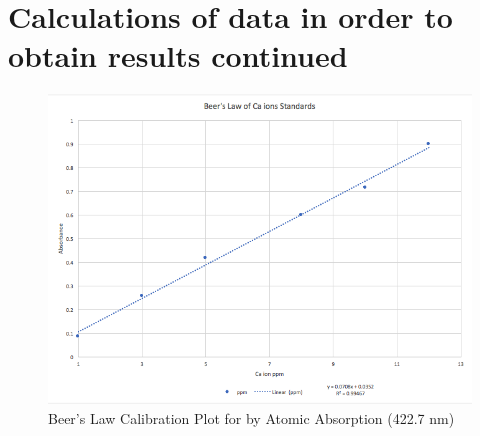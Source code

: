\documentclass[10pt]{article}
\begin{document}
\section{Calculations of data in order to obtain results continued}
   \begin{figure}[H]
\hfill\includegraphics[width=5in]{fig1}\hspace*{\fill}
\caption[Beer's Law Calibration Plot for  by Atomic Absorption (422.7 nm)]{Beer's Law Calibration Plot for  by Atomic Absorption (422.7 nm)}
\end{figure}
\end{document}
